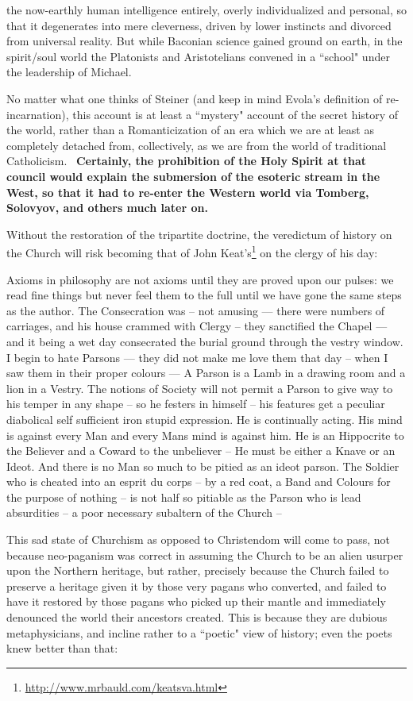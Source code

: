 \begin{quotex}
the now-earthly human intelligence entirely, overly individualized and personal, so that it degenerates into mere cleverness, driven by lower instincts and divorced from universal reality. But while Baconian science gained ground on earth, in the spirit/soul world the Platonists and Aristotelians convened in a ``school" under the leadership of Michael. 

\end{quotex}
No matter what one thinks of Steiner (and keep in mind Evola's definition of re-incarnation), this account is at least a ``mystery" account of the secret history of the world, rather than a Romanticization of an era which we are at least as completely detached from, collectively, as we are from the world of traditional Catholicism.  \textbf{Certainly, the prohibition of the Holy Spirit at that council would explain the submersion of the esoteric stream in the West, so that it had to re-enter the Western world via Tomberg, Solovyov, and others much later on.}

Without the restoration of the tripartite doctrine, the veredictum of history on the Church will risk becoming that of John Keat's\footnote{\url{http://www.mrbauld.com/keatsva.html}} on the clergy of his day:

\begin{quotex}
Axioms in philosophy are not axioms until they are proved upon our pulses: we read fine things but never feel them to the full until we have gone the same steps as the author. The Consecration was – not amusing — there were numbers of carriages, and his house crammed with Clergy – they sanctified the Chapel — and it being a wet day consecrated the burial ground through the vestry window. I begin to hate Parsons — they did not make me love them that day – when I saw them in their proper colours — A Parson is a Lamb in a drawing room and a lion in a Vestry. The notions of Society will not permit a Parson to give way to his temper in any shape – so he festers in himself – his features get a peculiar diabolical self sufficient iron stupid expression. He is continually acting. His mind is against every Man and every Mans mind is against him. He is an Hippocrite to the Believer and a Coward to the unbeliever – He must be either a Knave or an Ideot. And there is no Man so much to be pitied as an ideot parson. The Soldier who is cheated into an esprit du corps – by a red coat, a Band and Colours for the purpose of nothing – is not half so pitiable as the Parson who is lead absurdities – a poor necessary subaltern of the Church –

\end{quotex}
This sad state of Churchism as opposed to Christendom will come to pass, not because neo-paganism was correct in assuming the Church to be an alien usurper upon the Northern heritage, but rather, precisely because the Church failed to preserve a heritage given it by those very pagans who converted, and failed to have it restored by those pagans who picked up their mantle and immediately denounced the world their ancestors created. This is because they are dubious metaphysicians, and incline rather to a ``poetic" view of history; even the poets knew better than that:


